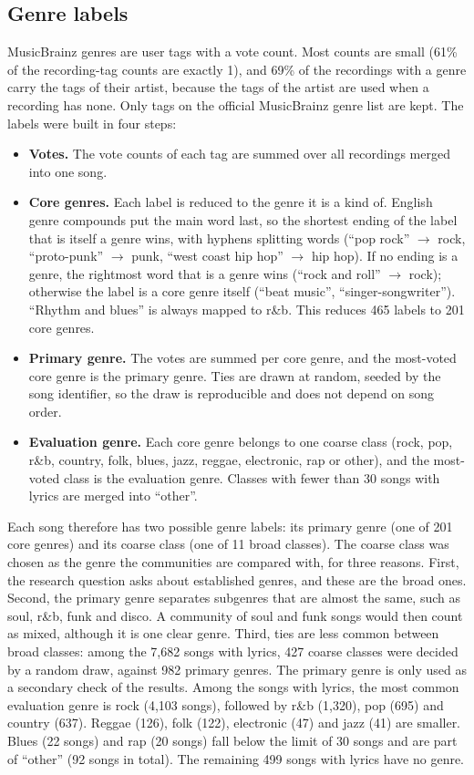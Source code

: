 \subsection*{Genre labels}
MusicBrainz genres are user tags with a vote count. Most counts are small (61\% of the recording-tag counts are exactly 1), and 69\% of the recordings with a genre carry the tags of their artist, because the tags of the artist are used when a recording has none. Only tags on the official MusicBrainz genre list are kept. The labels were built in four steps:
\begin{itemize}
  \item \textbf{Votes.} The vote counts of each tag are summed over all recordings merged into one song.
  \item \textbf{Core genres.} Each label is reduced to the genre it is a kind of. English genre compounds put the main word last, so the shortest ending of the label that is itself a genre wins, with hyphens splitting words (``pop rock'' $\rightarrow$ rock, ``proto-punk'' $\rightarrow$ punk, ``west coast hip hop'' $\rightarrow$ hip hop). If no ending is a genre, the rightmost word that is a genre wins (``rock and roll'' $\rightarrow$ rock); otherwise the label is a core genre itself (``beat music'', ``singer-songwriter''). ``Rhythm and blues'' is always mapped to r\&b. This reduces 465 labels to 201 core genres.
  \item \textbf{Primary genre.} The votes are summed per core genre, and the most-voted core genre is the primary genre. Ties are drawn at random, seeded by the song identifier, so the draw is reproducible and does not depend on song order.
  \item \textbf{Evaluation genre.} Each core genre belongs to one coarse class (rock, pop, r\&b, country, folk, blues, jazz, reggae, electronic, rap or other), and the most-voted class is the evaluation genre. Classes with fewer than 30 songs with lyrics are merged into ``other''.
\end{itemize}
Each song therefore has two possible genre labels: its primary genre (one of 201 core genres) and its coarse class (one of 11 broad classes). The coarse class was chosen as the genre the communities are compared with, for three reasons. First, the research question asks about established genres, and these are the broad ones. Second, the primary genre separates subgenres that are almost the same, such as soul, r\&b, funk and disco. A community of soul and funk songs would then count as mixed, although it is one clear genre. Third, ties are less common between broad classes: among the 7,682 songs with lyrics, 427 coarse classes were decided by a random draw, against 982 primary genres. The primary genre is only used as a secondary check of the results. Among the songs with lyrics, the most common evaluation genre is rock (4,103 songs), followed by r\&b (1,320), pop (695) and country (637). Reggae (126), folk (122), electronic (47) and jazz (41) are smaller. Blues (22 songs) and rap (20 songs) fall below the limit of 30 songs and are part of ``other'' (92 songs in total). The remaining 499 songs with lyrics have no genre.


